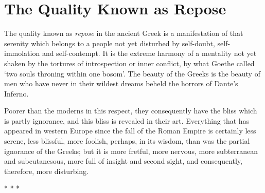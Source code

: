 \section{The Quality Known as Repose}

\begin{quotationx}
The quality known as \emph{repose} in the ancient Greek is a manifestation of that serenity which belongs to a people not yet disturbed by self-doubt, self-immolation and self-contempt. It is the extreme harmony of a mentality not yet shaken by the tortures of introspection or inner conflict, by what Goethe called `two souls throning within one bosom'. The beauty of the Greeks is the beauty of men who have never in their wildest dreams beheld the horrors of Dante's Inferno.

Poorer than the moderns in this respect, they consequently have the bliss which is partly ignorance, and this bliss is revealed in their art. Everything that has appeared in western Europe since the fall of the Roman Empire is certainly less serene, less blissful, more foolish, perhaps, in its wisdom, than was the partial ignorance of the Greeks; but it is more fretful, more nervous, more subterranean and subcutanesous, more full of insight and second sight, and consequently, therefore, more disturbing.
\end{quotationx}




\begin{center}* * *\end{center}

